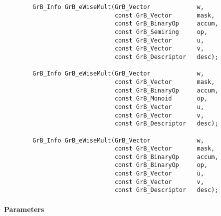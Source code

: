\begin{verbatim}
        GrB_Info GrB_eWiseMult(GrB_Vector             w,
                               const GrB_Vector       mask,
                               const GrB_BinaryOp     accum,
                               const GrB_Semiring     op,
                               const GrB_Vector       u,
                               const GrB_Vector       v,
                               const GrB_Descriptor   desc);
                            
        GrB_Info GrB_eWiseMult(GrB_Vector             w,
                               const GrB_Vector       mask,
                               const GrB_BinaryOp     accum,
                               const GrB_Monoid       op,
                               const GrB_Vector       u,
                               const GrB_Vector       v,
                               const GrB_Descriptor   desc);
                            
        GrB_Info GrB_eWiseMult(GrB_Vector             w,
                               const GrB_Vector       mask,
                               const GrB_BinaryOp     accum,
                               const GrB_BinaryOp     op,
                               const GrB_Vector       u,
                               const GrB_Vector       v,
                               const GrB_Descriptor   desc);
\end{verbatim}

\paragraph{Parameters}

